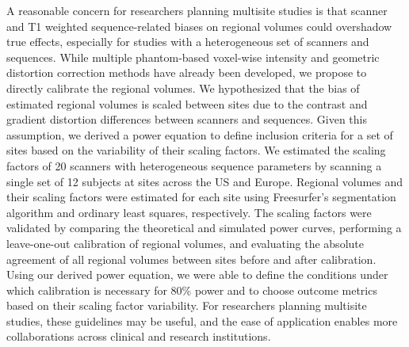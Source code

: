 
A reasonable concern for researchers planning multisite studies is that scanner and T1 weighted sequence-related biases on regional volumes could overshadow true effects, especially for studies with a heterogeneous set of scanners and sequences. While multiple phantom-based voxel-wise intensity and geometric distortion correction methods have already been developed, we propose to directly calibrate the regional volumes. We hypothesized that the bias of estimated regional volumes is scaled between sites due to the contrast and gradient distortion differences between scanners and sequences. Given this assumption, we derived a power equation to define inclusion criteria for a set of sites based on the variability of their scaling factors. We estimated the scaling factors of 20 scanners with heterogeneous sequence parameters by scanning a single set of 12 subjects at sites across the US and Europe. Regional volumes and their scaling factors were estimated for each site using Freesurfer's segmentation algorithm and ordinary least squares, respectively. The scaling factors were validated by comparing the theoretical and simulated power curves, performing a leave-one-out calibration of regional volumes, and evaluating the absolute agreement of all regional volumes between sites before and after calibration. Using our derived power equation, we were able to define the conditions under which calibration is necessary for 80\% power and to choose outcome metrics based on their scaling factor variability. For researchers planning multisite studies, these guidelines may be useful, and the ease of application enables more collaborations across clinical and research institutions.